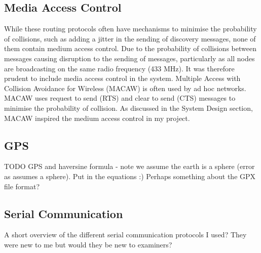\documentclass[12pt,a4paper]{report}
\begin{document}
\subsection{Media Access Control}
While these routing protocols often have mechanisms to minimise the probability of collisions, such as adding a jitter in the sending of discovery messages, none of them contain medium access control. Due to the probability of collisions between messages causing disruption to the sending of messages, particularly as all nodes are broadcasting on the same radio frequency (433 MHz). It was  therefore prudent to include media access control in the system. Multiple Access with Collision Avoidance for Wireless (MACAW) is often used by ad hoc networks. MACAW uses request to send (RTS) and clear to send (CTS) messages to minimise the probability of collision. As discussed in the System Design section, MACAW inspired the medium access control in my project. 

\subsection{GPS}
TODO GPS and haversine formula - note we assume the earth is a sphere (error as assumes a sphere). Put in the equations :) Perhaps something about the GPX file format?

\subsection{Serial Communication}
A short overview of the different serial communication protocols I used? They were new to me but would they be new to examiners?
\end{document}
